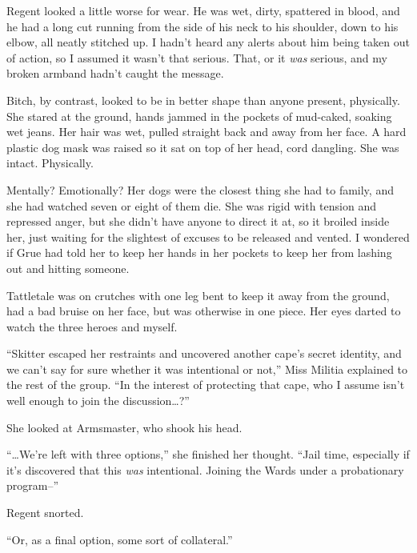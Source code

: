 Regent looked a little worse for wear.  He was wet, dirty, spattered in blood, and he had a long cut running from the side of his neck to his shoulder, down to his elbow, all neatly stitched up.  I hadn't heard any alerts about him being taken out of action, so I assumed it wasn't that serious.  That, or it \emph{was} serious, and my broken armband hadn't caught the message.



Bitch, by contrast, looked to be in better shape than anyone present, physically.  She stared at the ground, hands jammed in the pockets of mud-caked, soaking wet jeans.  Her hair was wet, pulled straight back and away from her face.  A hard plastic dog mask was raised so it sat on top of her head, cord dangling.  She was intact.  Physically.



Mentally?  Emotionally?  Her dogs were the closest thing she had to family, and she had watched seven or eight of them die.  She was rigid with tension and repressed anger, but she didn't have anyone to direct it at, so it broiled inside her, just waiting for the slightest of excuses to be released and vented.  I wondered if Grue had told her to keep her hands in her pockets to keep her from lashing out and hitting someone.



Tattletale was on crutches with one leg bent to keep it away from the ground, had a bad bruise on her face, but was otherwise in one piece.  Her eyes darted to watch the three heroes and myself.



``Skitter escaped her restraints and uncovered another cape's secret identity, and we can't say for sure whether it was intentional or not,'' Miss Militia explained to the rest of the group.  ``In the interest of protecting that cape, who I assume isn't well enough to join the discussion\ldots?''



She looked at Armsmaster, who shook his head.



``\ldots{}We're left with three options,'' she finished her thought.  ``Jail time, especially if it's discovered that this \emph{was} intentional.  Joining the Wards under a probationary program--''



Regent snorted.



``Or, as a final option, some sort of collateral.''



